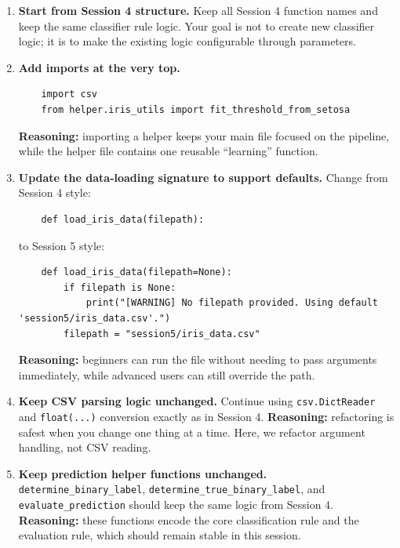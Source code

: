 \begin{enumerate}
    \item \textbf{Start from Session 4 structure.}
    Keep all Session 4 function names and keep the same classifier rule logic.
    Your goal is not to create new classifier logic; it is to make the existing logic configurable through parameters.

    \item \textbf{Add imports at the very top.}
    \begin{verbatim}
    import csv
    from helper.iris_utils import fit_threshold_from_setosa
    \end{verbatim}
    \noindent
    \textbf{Reasoning:} importing a helper keeps your main file focused on the pipeline, while the helper file contains one reusable ``learning'' function.

    \item \textbf{Update the data-loading signature to support defaults.}
    Change from Session 4 style:
    \begin{verbatim}
    def load_iris_data(filepath):
    \end{verbatim}
    to Session 5 style:
    \begin{verbatim}
    def load_iris_data(filepath=None):
        if filepath is None:
            print("[WARNING] No filepath provided. Using default 'session5/iris_data.csv'.")
        filepath = "session5/iris_data.csv"
    \end{verbatim}
    \noindent
    \textbf{Reasoning:} beginners can run the file without needing to pass arguments immediately, while advanced users can still override the path.

    \item \textbf{Keep CSV parsing logic unchanged.}
    Continue using \texttt{csv.DictReader} and \texttt{float(...)} conversion exactly as in Session 4.
    \noindent
    \textbf{Reasoning:} refactoring is safest when you change one thing at a time. Here, we refactor argument handling, not CSV reading.

    \item \textbf{Keep prediction helper functions unchanged.}
    \texttt{determine\_binary\_label}, \texttt{determine\_true\_binary\_label}, and \texttt{evaluate\_prediction} should keep the same logic from Session 4.
    \noindent
    \textbf{Reasoning:} these functions encode the core classification rule and the evaluation rule, which should remain stable in this session.


\end{enumerate}
